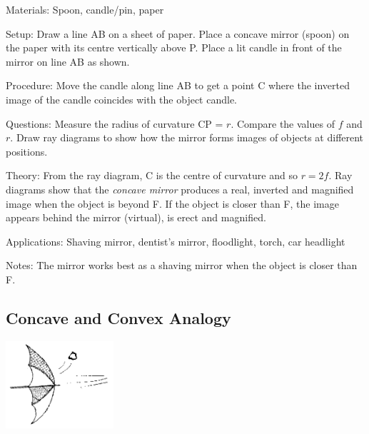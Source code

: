\begin{multicols}{2}
\begin{description*}
\item[Materials:]{Spoon, candle/pin, paper}
\item[Setup:]{Draw a line AB on a sheet of paper. Place a concave mirror (spoon) on the paper with its centre vertically above P. Place a lit candle in front of the mirror on line AB as shown.}
\item[Procedure:]{Move the candle along line AB to get a point C where the inverted image of the candle coincides with the object candle.}
\item[Questions:]{Measure the radius of curvature CP = $r$. Compare the values of $f$ and $r$. Draw ray diagrams to show how the mirror forms images of objects at different positions.}
\item[Theory:]{From the ray diagram, C is the centre of curvature and so $r=2f$. Ray diagrams show that the \emph{concave mirror} produces a real, inverted and magnified image when the object is beyond F. If the object is closer than F, the image appears behind the mirror (virtual), is erect and magnified.}
\item[Applications:]{Shaving mirror, dentist's mirror, floodlight, torch, car headlight}
\item[Notes:]{The mirror works best as a shaving mirror when the object is closer than F.}
\end{description*}

\vfill
\columnbreak

\subsection{Concave and Convex Analogy}

\begin{center}
\includegraphics[width=0.3\textwidth]{./img/source/umbrella.png}
\end{center}


\end{multicols}
